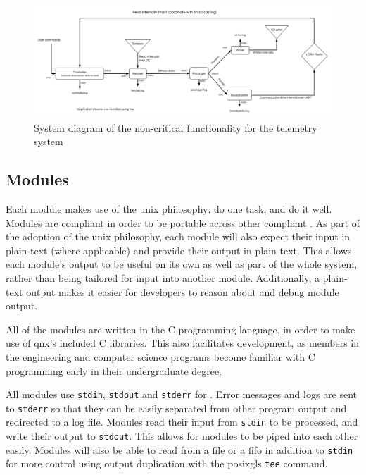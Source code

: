 \begin{figure}[H]
    \includegraphics[width=\linewidth]{assets/non-critical-architecture.png}
    \caption{System diagram of the non-critical functionality for the telemetry system}
    \label{fig:non-crit-arc}
\end{figure}

\subsection{Modules} \label{s:modules}

Each module makes use of the \gls{unix} philosophy: do one task, and do it well. Modules are 
compliant in order to be portable across other  compliant . As part of the
adoption of the \gls{unix} philosophy, each module will also expect their input in plain-text (where applicable) and
provide their output in plain text. This allows each module's output to be useful on its own as well as part of the
whole system, rather than being tailored for input into another module. Additionally, a plain-text output makes it
easier for developers to reason about and debug module output.

All of the modules are written in the C programming language, in order to make use of \gls{qnx}'s included C libraries.
This also facilitates  development, as members in the engineering and computer science programs
become familiar with C programming early in their undergraduate degree.

All modules use \texttt{\gls{stdin}}, \texttt{\gls{stdout}} and \texttt{\gls{stderr}} for . Error
messages and logs are sent to \texttt{\gls{stderr}} so that they can be easily separated from other program output and
redirected to a log file. Modules read their input from \texttt{\gls{stdin}} to be processed, and write their output to
\texttt{\gls{stdout}}. This allows for modules to be piped into each other easily. Modules will also be able to read
from a file or a \gls{fifo} in addition to \texttt{\gls{stdin}} for more control using output duplication with the
\gls{posixgls} \texttt{tee} command.

